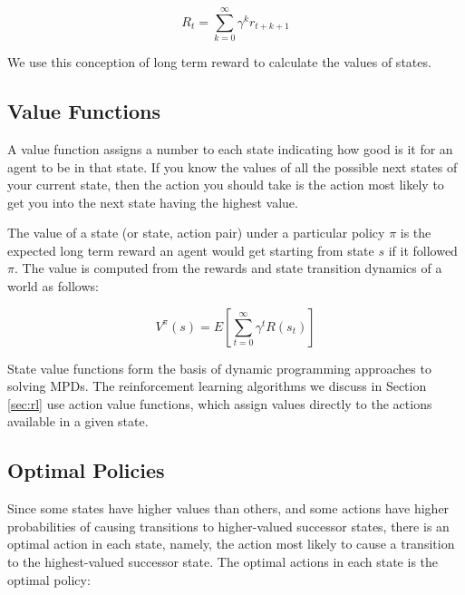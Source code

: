 \begin{equation}
R_t = \sum_{k=0}^{\infty} \gamma^k r_{t+k+1}
\end{equation}

 We use this conception of long term reward to calculate the values of states.

\subsection{Value Functions}

A value function assigns a number to each state indicating how good is it for an agent to be in that state. If you know the values of all the possible next states of your current state, then the action you should take is the action most likely to get you into the next state having the highest value.

The value of a state (or state, action pair) under a particular policy $\pi$ is the expected long term reward an agent would get starting from state $s$ if it followed $\pi$. The value is computed from the rewards and state transition dynamics of a world as follows:

\begin{equation}
V^\pi(s) = E \left [ \sum_{t=0}^{\infty} \gamma^t R(s_t) \right ]
\end{equation}

State value functions form the basis of dynamic programming approaches to solving MPDs. The reinforcement learning algorithms we discuss in Section \ref{sec:rl} use action value functions, which assign values directly to the actions available in a given state.

\subsection{Optimal Policies}

Since some states have higher values than others, and some actions have higher probabilities of causing transitions to higher-valued successor states, there is an optimal action in each state, namely, the action most likely to cause a transition to the highest-valued successor state. The optimal actions in each state is the optimal policy:

